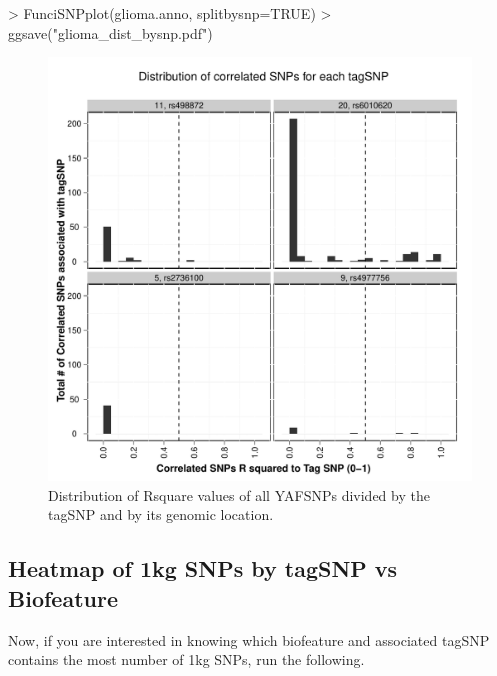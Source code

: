 \documentclass[12pt,fullpage]{article}
\begin{document}
\begin{Schunk}
\begin{Sinput}
> FunciSNPplot(glioma.anno, splitbysnp=TRUE)
> ggsave("glioma_dist_bysnp.pdf")
\end{Sinput}
\end{Schunk}

\begin{figure}[ht!]                                                              
\begin{center}                                                                   
\includegraphics{glioma_dist_bysnp.pdf}                                          
\caption{\label{fig:glioma_dist_bysnp.pdf} Distribution of Rsquare values of all 
     YAFSNPs divided by the tagSNP and by its genomic location.}                 
{\footnotesize{}}                                                                
\end{center}                                                                     
\end{figure}

\subsection{Heatmap of 1kg SNPs by tagSNP vs Biofeature}

Now, if you are interested in knowing which biofeature and associated tagSNP
contains the most number of 1kg SNPs, run the following.
\end{document}
